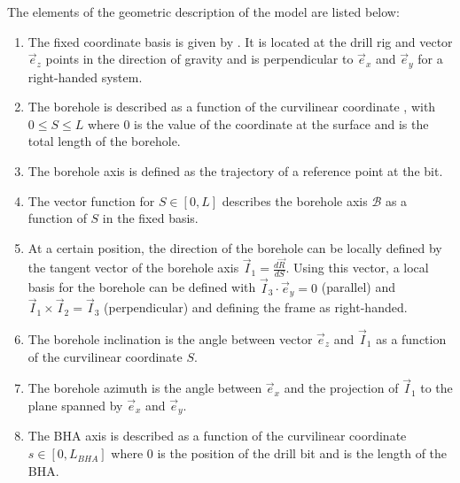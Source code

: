 The elements of the geometric description of the model are listed below:
\begin{enumerate}
	\item The fixed coordinate basis is given by . It is located at the drill rig and vector $\vec{e}_z$ points in the direction of gravity and is perpendicular to $\vec{e}_x$ and $\vec{e}_y$ for a right-handed system. 
	
	\item The borehole is described as a function of the curvilinear coordinate , with $0 \leq S \leq L$ where $0$ is the value of the coordinate at the surface and  is the total length of the borehole.
	
	\item The borehole axis  is defined as the trajectory of a reference point at the bit.
	
	\item The vector function  for $S \in [0,L]$ describes the borehole axis $\mathcal{B}$ as a function of $S$ in the fixed basis.
	
	\item At a certain position, the direction of the borehole can be locally defined by the tangent vector of the borehole axis $\vec{I}_1 = \frac{d \vec{R}}{d S}$. Using this vector, a local basis  for the borehole can be defined with $\vec{I}_3 \cdot \vec{e}_y = 0$ (parallel) and $\vec{I}_1 \times \vec{I}_2 = \vec{I}_3$ (perpendicular) and defining the frame as right-handed.
	
	\item The borehole inclination  is the angle between vector $\vec{e}_z$ and $\vec{I}_1$ as a function of the curvilinear coordinate $S$.
	
	\item The borehole azimuth  is the angle between $\vec{e}_x$ and the projection of $\vec{I}_1$ to the plane spanned by $\vec{e}_x$ and $\vec{e}_y$.
	
	\item The \acs{BHA} axis is described as a function of the curvilinear coordinate $s \in [0,L_{BHA}]$ where $0$ is the position of the drill bit and  is the length of the \acs{BHA}.
	

\end{enumerate}
